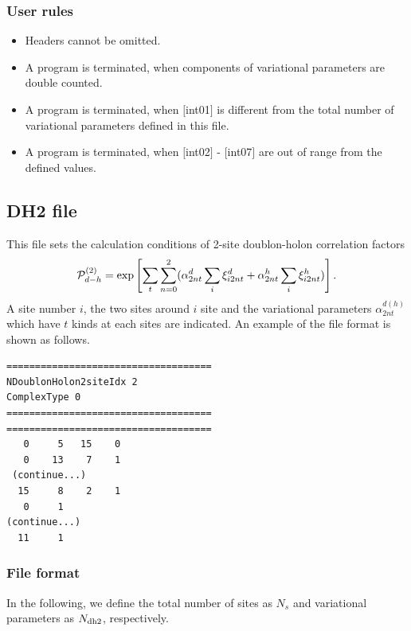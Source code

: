 \subsubsection{User rules}
\begin{itemize}
\item Headers cannot be omitted. 
\item A program is terminated, when components of variational parameters are double counted.
\item A program is terminated, when $[$int01$]$ is different from the total number of variational parameters defined in this file.
\item A program is terminated, when $[$int02$]$ - $[$int07$]$ are out of range from the defined values.
\end{itemize}

\newpage
\subsection{DH2 file}
\label{Subsec:DH2}
This file sets the calculation conditions of 2-site doublon-holon correlation factors 
\begin{equation}
{\cal P}_{d-h}^{(2)}= \exp \left[ \sum_t \sum_{n=0}^2 (\alpha_{2nt}^d \sum_{i}\xi_{i2nt}^d+\alpha_{2nt}^h \sum_{i}\xi_{i2nt}^h)\right].
\end{equation}
A site number $i$, the two sites around $i$ site and the variational parameters $\alpha_{2nt}^{d(h)}$ which have $t$ kinds at each sites are indicated.
An example of the file format is shown as follows.

\begin{minipage}{12.5cm}
\begin{screen}
\begin{verbatim}
====================================
NDoublonHolon2siteIdx 2  
ComplexType 0
====================================
====================================
   0     5   15    0
   0    13    7    1
 (continue...)
  15     8    2    1
   0     1 
(continue...)
  11     1 
\end{verbatim}
\end{screen}
\end{minipage}

\subsubsection{File format}
In the following, we define the total number of sites as $N_s$ and variational parameters as $N_{\rm dh2}$, respectively.  

